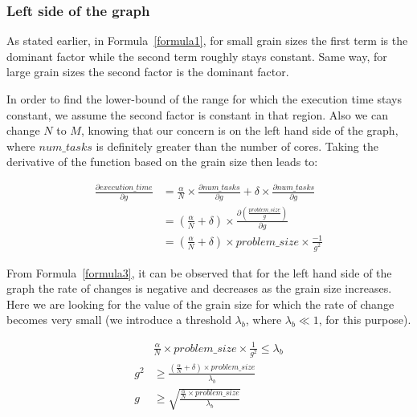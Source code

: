 \vspace{\baselineskip}
\subsubsection{Left side of the graph}
As stated earlier, in Formula~\ref{formula1}, for small grain sizes the first term is the dominant factor while the second term roughly stays constant. Same way, for large grain sizes the second factor is the dominant factor. 

In order to find the lower-bound of the range for which the execution time stays constant, we assume the second factor is constant in that region. Also we can change $N$ to $M$, knowing that our concern is on the left hand side of the graph, where $num\_{tasks}$ is definitely greater than the number of cores. 
Taking the derivative of the function based on the grain size then leads to:

 
\begin{equation}\label{formula3}
\begin{aligned}
\frac{\partial execution\_{time}}{\partial g} &= \frac{\alpha}{N}\times{\frac{\partial num\_{tasks}}{\partial g}}+\delta\times{\frac{\partial num\_{tasks}}{\partial g}} \\
&=(\frac{\alpha}{N}+\delta)\times\frac{\partial(\frac{problem\_{size}}{g})}{\partial g} \\
&=(\frac{\alpha}{N}+\delta)\times{problem\_{size}}\times{\frac{-1}{g^2}}
\end{aligned}
\end{equation}

From Formula~\ref{formula3}, it can be observed that for the left hand side of the graph the rate of changes is negative and decreases as the grain size increases. Here we are looking for the value of the grain size for which the rate of change becomes very small (we introduce a threshold $\lambda_b$, where $\lambda_b\ll1$, for this purpose). 


\begin{equation}\label{formula4}
\begin{aligned}
&\frac{\alpha}{N}\times{problem\_{size}}\times{\frac{1}{g^2}}\leq{\lambda_b} \\
{g^2}&\geq{\frac{(\frac{\alpha}{N}+\delta)\times{problem\_{size}}}{\lambda_b}}\\
{g}&\geq{\sqrt{\frac{\frac{\alpha}{N}\times{problem\_{size}}}{\lambda_b}}}
\end{aligned}
\end{equation}

